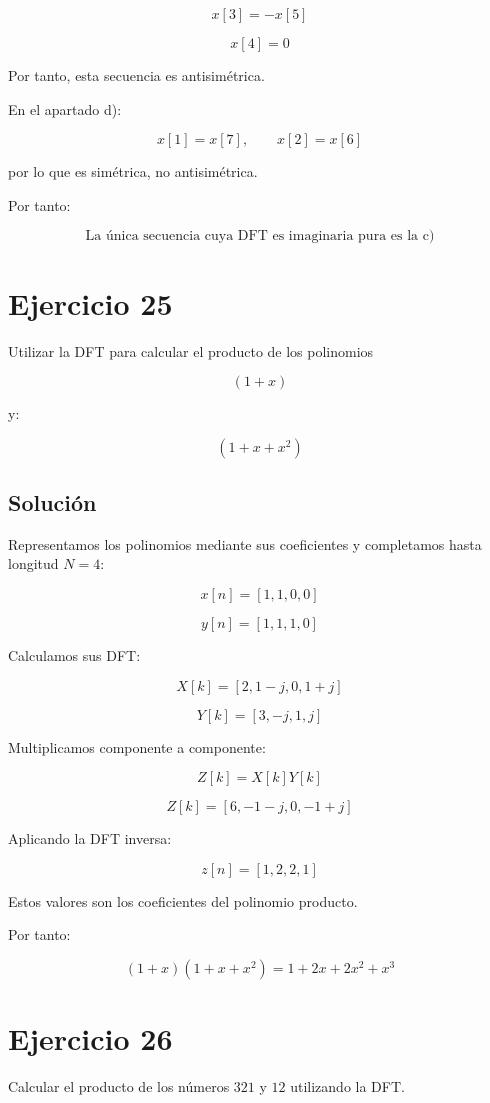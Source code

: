\documentclass[fleqn]{article}
\begin{document}
	\[
	x[3]=-x[5]
	\]

	\[
	x[4]=0
	\]

	Por tanto, esta secuencia es antisimétrica.

	En el apartado d):

	\[
	x[1]=x[7],
	\qquad
	x[2]=x[6]
	\]

	por lo que es simétrica, no antisimétrica.

	Por tanto:

	\[
	\boxed{
	\text{La única secuencia cuya DFT es imaginaria pura es la c)}
	}
	\]

\section{Ejercicio 25}
	Utilizar la DFT para calcular el producto de los polinomios

	\[
	(1+x)
	\]

	y:

	\[
	(1+x+x^2)
	\]

	\subsection{Solución}

	Representamos los polinomios mediante sus coeficientes y completamos hasta longitud $N=4$:

	\[
	x[n]=[1,1,0,0]
	\]

	\[
	y[n]=[1,1,1,0]
	\]

	Calculamos sus DFT:

	\[
	\boxed{
	X[k]=[2,1-j,0,1+j]
	}
	\]

	\[
	\boxed{
	Y[k]=[3,-j,1,j]
	}
	\]

	Multiplicamos componente a componente:

	\[
	Z[k]
	=
	X[k]Y[k]
	\]

	\[
	Z[k]
	=
	[6,-1-j,0,-1+j]
	\]

	Aplicando la DFT inversa:

	\[
	z[n]
	=
	[1,2,2,1]
	\]

	Estos valores son los coeficientes del polinomio producto.

	Por tanto:

	\[
	\boxed{
	(1+x)(1+x+x^2)
	=
	1+2x+2x^2+x^3
	}
	\]

\section{Ejercicio 26}
	Calcular el producto de los números $321$ y $12$ utilizando la DFT.
\end{document}
